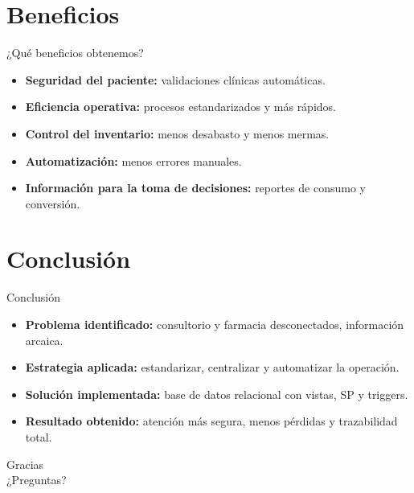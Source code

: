 \documentclass[aspectratio=169,11pt]{beamer}
\begin{document}
\section{Beneficios}
\begin{frame}{¿Qué beneficios obtenemos?}
  \begin{itemize}
    \item \textbf{Seguridad del paciente:} validaciones clínicas automáticas.
    \item \textbf{Eficiencia operativa:} procesos estandarizados y más rápidos.
    \item \textbf{Control del inventario:} menos desabasto y menos mermas.
    \item \textbf{Automatización:} menos errores manuales.
    \item \textbf{Información para la toma de decisiones:} reportes de consumo y conversión.
  \end{itemize}
\end{frame}

\section{Conclusión}
\begin{frame}{Conclusión}
  \begin{itemize}
    \item \textbf{Problema identificado:} consultorio y farmacia desconectados, información arcaica.
    \item \textbf{Estrategia aplicada:} estandarizar, centralizar y automatizar la operación.
    \item \textbf{Solución implementada:} base de datos relacional con vistas, SP y triggers.
    \item \textbf{Resultado obtenido:} atención más segura, menos pérdidas y trazabilidad total.
  \end{itemize}
\end{frame}

\begin{frame}[plain]
  \begin{center}
    \Large Gracias\\[0.4em]
    \normalsize ¿Preguntas?
  \end{center}
\end{frame}
\end{document}
